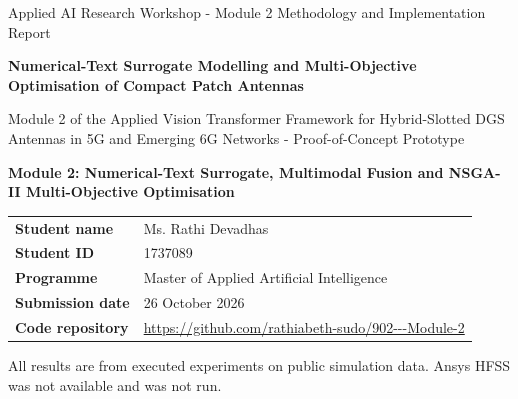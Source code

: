 \documentclass[11pt,a4paper]{article}
\begin{document}
\begin{titlepage}\centering\vspace*{2cm}
{\color{navy}\large Applied AI Research Workshop - Module 2 Methodology and Implementation Report\par}\vspace{0.8cm}
{\color{navy}\LARGE\bfseries Numerical-Text Surrogate Modelling and Multi-Objective Optimisation of Compact Patch Antennas\par}\vspace{0.5cm}
{\large Module 2 of the Applied Vision Transformer Framework for Hybrid-Slotted DGS Antennas in 5G and Emerging 6G Networks - Proof-of-Concept Prototype\par}\vspace{1cm}
{\bfseries Module 2: Numerical-Text Surrogate, Multimodal Fusion and NSGA-II Multi-Objective Optimisation\par}\vspace{2cm}
\begin{tabular}{ll}
\textbf{Student name} & Ms. Rathi Devadhas \\
\textbf{Student ID} & 1737089 \\
\textbf{Programme} & Master of Applied Artificial Intelligence \\
\textbf{Submission date} & 26 October 2026 \\
\textbf{Code repository} & \url{https://github.com/rathiabeth-sudo/902---Module-2} \\
\end{tabular}\vfill
{\small All results are from executed experiments on public simulation data. Ansys HFSS was not available and was not run.\par}
\end{titlepage}
\tableofcontents\newpage
\end{document}
